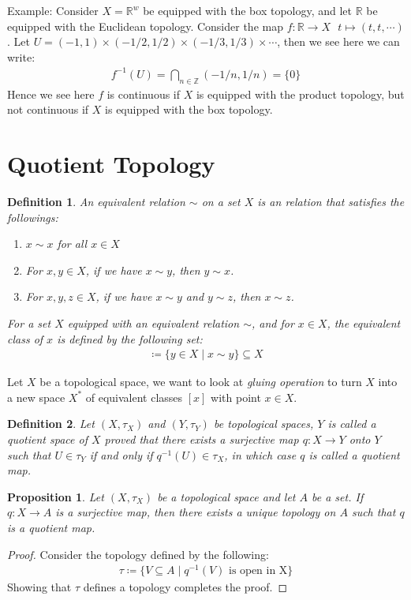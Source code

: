 \documentclass[11pt]{book}
\theoremstyle{break}
\theoremstyle{break}
\newtheorem{prop}[lem]{Proposition}
\newtheorem{defn}{Definition}[corL]
\newcommand{\R}{\mathbb{R}}
\newcommand{\Z}{\mathbb{Z}}
\newcommand{\example}{\color{green}Example: \color{black}}
\begin{document}
\example Consider $X = \R^w$ be equipped with the box topology, and let $\R$ be equipped with the Euclidean topology. Consider the map $f:\R \to X \ \ \ t\mapsto (t,t,\cdots)$. Let $U = (-1,1)\times (-1/2,1/2) \times (-1/3,1/3) \times \cdots$, then we see here we can write:
\begin{align*}
f^{-1}(U) = \bigcap_{n \in \Z}(-1/n, 1/n) = \{0\}
\end{align*}
Hence we see here $f$ is continuous if $X$ is equipped with the product topology, but not continuous if $X$ is equipped with the box topology.\\

\newpage
\section[Quotient Topology]{\color{red} Quotient Topology \color{black}}
\begin{defn}
An equivalent relation $\sim$ on a set $X$ is an relation that satisfies the followings:
\begin{enumerate}[topsep=3pt,itemsep=-1ex,partopsep=1ex,parsep=1ex]
\item $x\sim x$ for all $x \in X$
\item For $x,y \in X$, if we have $x\sim y$, then $y\sim x$. 
\item For $x,y,z\in X$, if we have $x\sim y$ and $y\sim z$, then $x\sim z$. 
\end{enumerate}
For a set $X$ equipped with an equivalent relation $\sim$, and for $x \in X$, the equivalent class of $x$ is defined by the following set:
\begin{align*}
[x] \coloneqq \{ y \in X\mid x\sim y\} \subseteq X
\end{align*}
\end{defn}


Let $X$ be a topological space, we want to look at \textit{gluing operation} to turn $X$ into a new space $X^*$ of equivalent classes $[x]$ with point $x \in X$. 

\begin{defn}
Let $(X,\tau_X)$ and $(Y,\tau_Y)$ be topological spaces, $Y$ is called a quotient space of $X$ proved that there exists a surjective map $q:X\to Y$ onto $Y$ such that $U\in \tau_Y$ if and only if $q^{-1}(U)\in \tau_X$, in which case $q$ is called a quotient map.
\end{defn}

\begin{prop}
Let $(X,\tau_X)$ be a topological space and let $A$ be a set. If $q:X\to A$ is a surjective map, then there exists a unique topology on $A$ such that $q$ is a quotient map.
\end{prop}
\begin{proof}
Consider the topology defined by the following:
\begin{align*}
\tau\coloneqq \{ V\subseteq A \mid q^{-1}(V) \text{ is open in X}\}
\end{align*}
Showing that $\tau$ defines a topology completes the proof. 
\end{proof}
\end{document}
